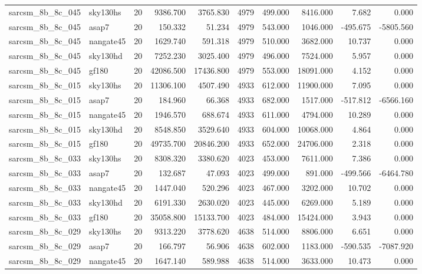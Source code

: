 \documentclass{article}
\begin{document}
\begin{longtable}{llrrrrrrrr}
sarcsm\_8b\_8c\_045 & sky130hs & 20 & 9386.700 & 3765.830 & 4979 & 499.000 & 8416.000 & 7.682 & 0.000 \\
sarcsm\_8b\_8c\_045 & asap7 & 20 & 150.332 & 51.234 & 4979 & 543.000 & 1046.000 & -495.675 & -5805.560 \\
sarcsm\_8b\_8c\_045 & nangate45 & 20 & 1629.740 & 591.318 & 4979 & 510.000 & 3682.000 & 10.737 & 0.000 \\
sarcsm\_8b\_8c\_045 & sky130hd & 20 & 7252.230 & 3025.400 & 4979 & 496.000 & 7524.000 & 5.957 & 0.000 \\
sarcsm\_8b\_8c\_045 & gf180 & 20 & 42086.500 & 17436.800 & 4979 & 553.000 & 18091.000 & 4.152 & 0.000 \\
sarcsm\_8b\_8c\_015 & sky130hs & 20 & 11306.100 & 4507.490 & 4933 & 612.000 & 11900.000 & 7.095 & 0.000 \\
sarcsm\_8b\_8c\_015 & asap7 & 20 & 184.960 & 66.368 & 4933 & 682.000 & 1517.000 & -517.812 & -6566.160 \\
sarcsm\_8b\_8c\_015 & nangate45 & 20 & 1946.570 & 688.674 & 4933 & 611.000 & 4794.000 & 10.289 & 0.000 \\
sarcsm\_8b\_8c\_015 & sky130hd & 20 & 8548.850 & 3529.640 & 4933 & 604.000 & 10068.000 & 4.864 & 0.000 \\
sarcsm\_8b\_8c\_015 & gf180 & 20 & 49735.700 & 20846.200 & 4933 & 652.000 & 24706.000 & 2.318 & 0.000 \\
sarcsm\_8b\_8c\_033 & sky130hs & 20 & 8308.320 & 3380.620 & 4023 & 453.000 & 7611.000 & 7.386 & 0.000 \\
sarcsm\_8b\_8c\_033 & asap7 & 20 & 132.687 & 47.093 & 4023 & 499.000 & 891.000 & -499.566 & -6464.780 \\
sarcsm\_8b\_8c\_033 & nangate45 & 20 & 1447.040 & 520.296 & 4023 & 467.000 & 3202.000 & 10.702 & 0.000 \\
sarcsm\_8b\_8c\_033 & sky130hd & 20 & 6191.330 & 2630.020 & 4023 & 445.000 & 6269.000 & 5.189 & 0.000 \\
sarcsm\_8b\_8c\_033 & gf180 & 20 & 35058.800 & 15133.700 & 4023 & 484.000 & 15424.000 & 3.943 & 0.000 \\
sarcsm\_8b\_8c\_029 & sky130hs & 20 & 9313.220 & 3778.620 & 4638 & 514.000 & 8806.000 & 6.651 & 0.000 \\
sarcsm\_8b\_8c\_029 & asap7 & 20 & 166.797 & 56.906 & 4638 & 602.000 & 1183.000 & -590.535 & -7087.920 \\
sarcsm\_8b\_8c\_029 & nangate45 & 20 & 1647.140 & 589.988 & 4638 & 514.000 & 3633.000 & 10.473 & 0.000 \\

\end{longtable}
\end{document}
